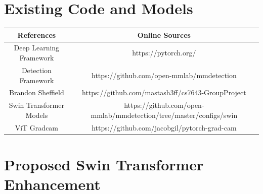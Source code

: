 \documentclass[10pt,twocolumn,letterpaper]{article}
\begin{document}
\begin{table}[h!]
\begin{center}
\end{center}
\caption{Contributions of team members.}
\label{tab:contributions}
\end{table}


{\small


}

\clearpage
\appendix
\label{sec:appendix}

\section{Existing Code and Models} \label{existingCodeSection}

\begin{table}[h!]
\begin{center}
\begin{tabular}{||c|c||}
\hline
References & Online Sources \\
\hline\hline
Deep Learning Framework & https://pytorch.org/ \\
Detection Framework     & https://github.com/open-mmlab/mmdetection \\
Brandon Sheffield       & https://github.com/mastash3ff/cs7643-GroupProject \\
Swin Transformer Models & https://github.com/open-mmlab/mmdetection/tree/master/configs/swin \\
ViT Gradcam & https://github.com/jacobgil/pytorch-grad-cam \\
\hline
\end{tabular}
\end{center}
\label{tab:existing}
\end{table}

\clearpage

\section{Proposed Swin Transformer Enhancement} \label{proposedSwin}
\end{document}
